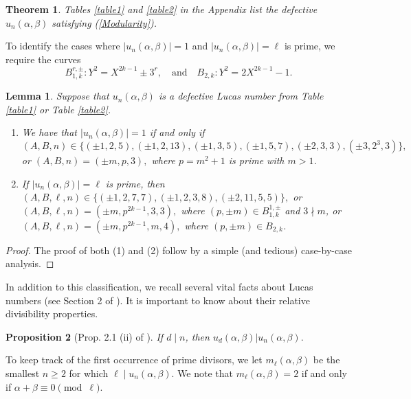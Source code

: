 \documentclass[12pt]{amsart}
\newtheorem{thm}{Theorem}[section]
\newtheorem{lem}{Lemma}[section]
\newtheorem{prop}[thm]{Proposition}
\newcommand{\?}{\color{red}?}
\numberwithin{equation}{section}
\begin{document}
\begin{thm}\label{AwesomeList}
Tables \ref{table1} and \ref{table2} in the Appendix list the defective $u_n(\alpha,\beta)$
 satisfying (\ref{Modularity}).
\end{thm}


To identify the cases where $|u_n(\alpha,\beta)| = 1$ and $|u_n(\alpha,\beta)|=\ell$ is prime, we require the curves
\begin{equation}
 B_{1, k}^{r, \pm} : Y^2 = X^{2k-1} \pm 3^r,\quad \mathrm{and}\quad B_{2, k} : Y^2 = 2X^{2k-1} -1.
 \end{equation}

\begin{lem}\label{Part1DefectivePrimality}
Suppose that $u_n(\alpha,\beta)$ is a defective Lucas number from Table \ref{table1} or Table \ref{table2}.
\begin{enumerate}
\item We have that $|u_n(\alpha,\beta)|=1$ if and only if 
$$(A,B,n) \in \big\{ (\pm 1, 2, 5), (\pm 1, 2, 13), (\pm 1, 3, 5), (\pm 1, 5, 7), (\pm 2, 3, 3), (\pm 3, 2^3, 3) \big\},$$
or $(A,B,n) = (\pm m, p, 3),$ where $p = m^2+1$ is prime with $m>1$.

\item If $|u_n(\alpha,\beta)|=\ell$ is prime, then 
$(A,B,\ell, n) \in \big\{ (\pm 1, 2,7, 7), (\pm 1, 2,3, 8), (\pm 2, 11,5, 5) \big\},
$
or $(A,B,\ell, n) = (\pm m, p^{2k-1},3, 3),$ where $(p, \pm m)\in B^{1, \pm}_{1,k}$ and $3\nmid m$,  or $(A,B,\ell, n) = (\pm m, p^{2k-1},m, 4),$ where $(p, \pm m)\in B_{2,k}$.


\end{enumerate}
\end{lem}
\begin{proof} The proof of both (1) and (2) follow by a simple (and tedious) case-by-case analysis. 
\end{proof}

In addition to this classification, we recall several vital facts about Lucas numbers (see Section 2 of  \cite{BHV}).
It is important to know about
their relative divisibility properties. 

\begin{prop}[Prop. 2.1 (ii) of \cite{BHV}]\label{PropA}  If $d\mid n$, then $u_d(\alpha, \beta) | u_n(\alpha,\beta).$
\end{prop}

To keep track of the first occurrence of prime divisors, we let $m_{\ell}(\alpha,\beta)$ be the smallest $n\geq 2$
for which $\ell \mid u_n(\alpha,\beta)$. We note that $m_{\ell}(\alpha,\beta)=2$ if and only if
$\alpha +\beta\equiv 0\pmod {\ell}.$
\end{document}
